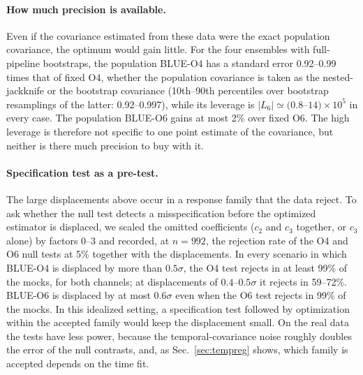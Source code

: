 \documentclass[aps,prd,preprint,nofootinbib,floatfix]{revtex4-2}
\begin{document}
\paragraph{How much precision is available.} Even if the covariance estimated from these data were the exact population covariance, the optimum would gain little. For the four ensembles with full-pipeline bootstraps, the population BLUE-O4 has a standard error 0.92--0.99 times that of fixed O4, whether the population covariance is taken as the nested-jackknife or the bootstrap covariance (10th--90th percentiles over bootstrap resamplings of the latter: 0.92--0.997), while its leverage is $|L_6|\simeq(0.8$--$14)\times10^5$ in every case. The population BLUE-O6 gains at most 2\% over fixed O6. The high leverage is therefore not specific to one point estimate of the covariance, but neither is there much precision to buy with it.

\paragraph{Specification test as a pre-test.} The large displacements above occur in a response family that the data reject. To ask whether the null test detects a misspecification before the optimized estimator is displaced, we scaled the omitted coefficients ($c_2$ and $c_3$ together, or $c_3$ alone) by factors 0--3 and recorded, at $n=992$, the rejection rate of the O4 and O6 null tests at 5\% together with the displacements. In every scenario in which BLUE-O4 is displaced by more than $0.5\sigma$, the O4 test rejects in at least 99\% of the mocks, for both channels; at displacements of $0.4$--$0.5\sigma$ it rejects in 59--72\%. BLUE-O6 is displaced by at most $0.6\sigma$ even when the O6 test rejects in 99\% of the mocks. In this idealized setting, a specification test followed by optimization within the accepted family would keep the displacement small. On the real data the tests have less power, because the temporal-covariance noise roughly doubles the error of the null contrasts, and, as Sec.~\ref{sec:tempreg} shows, which family is accepted depends on the time fit.
\end{document}
